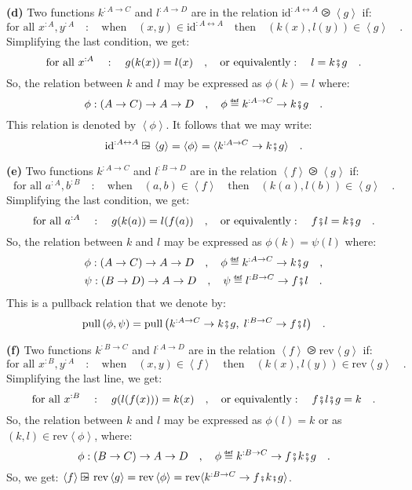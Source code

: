 \textbf{(d)} Two functions $k^{:A\rightarrow C}$ and $l^{:A\rightarrow D}$
are in the relation $\text{id}^{:A\leftrightarrow A}\ogreaterthan\left<g\right>$
if:
\[
\text{for all }x^{:A},y^{:A}\quad:\quad\text{when}\quad(x,y)\in\text{id}^{:A\leftrightarrow A}\quad\text{then}\quad(k(x),l(y))\in\left<g\right>\quad.
\]
Simplifying the last condition, we get:
\[
\text{for all }x^{:A}\quad:\quad g(k(x))=l(x)\quad,\quad\text{or equivalently}:\quad l=k\bef g\quad.
\]
So, the relation between $k$ and $l$ may be expressed as $\phi(k)=l$
where:
\[
\phi:\left(A\rightarrow C\right)\rightarrow A\rightarrow D\quad,\quad\phi\triangleq k^{:A\rightarrow C}\rightarrow k\bef g\quad.
\]
This relation is denoted by $\left<\phi\right>$. It follows that
we may write: 
\[
\text{id}^{:A\leftrightarrow A}\ogreaterthan\left<g\right>=\left<\phi\right>=\langle k^{:A\rightarrow C}\rightarrow k\bef g\rangle\quad.
\]

\textbf{(e)} Two functions $k^{:A\rightarrow C}$ and $l^{:B\rightarrow D}$
are in the relation $\left<f\right>\ogreaterthan\left<g\right>$ if:
\[
\text{for all }a^{:A},b^{:B}\quad:\quad\text{when}\quad(a,b)\in\left<f\right>\quad\text{then}\quad(k(a),l(b))\in\left<g\right>\quad.
\]
Simplifying the last condition, we get:
\[
\text{for all }a^{:A}\quad:\quad g(k(a))=l(f(a))\quad,\quad\text{or equivalently}:\quad f\bef l=k\bef g\quad.
\]
So, the relation between $k$ and $l$ may be expressed as $\phi(k)=\psi(l)$
where: 
\begin{align*}
 & \phi:\left(A\rightarrow C\right)\rightarrow A\rightarrow D\quad,\quad\phi\triangleq k^{:A\rightarrow C}\rightarrow k\bef g\quad,\\
 & \psi:\left(B\rightarrow D\right)\rightarrow A\rightarrow D\quad,\quad\psi\triangleq l^{:B\rightarrow C}\rightarrow f\bef l\quad.
\end{align*}
 This is a pullback relation that we denote by: 
\[
\text{pull}\,(\phi,\psi)=\text{pull}\,\big(k^{:A\rightarrow C}\rightarrow k\bef g,\;l^{:B\rightarrow C}\rightarrow f\bef l\big)\quad.
\]

\textbf{(f)} Two functions $k^{:B\rightarrow C}$ and $l^{:A\rightarrow D}$
are in the relation $\left<f\right>\ogreaterthan\text{rev}\left<g\right>$
if:
\[
\text{for all }x^{:B},y^{:A}\quad:\quad\text{when}\quad(x,y)\in\left<f\right>\quad\text{then}\quad(k(x),l(y))\in\text{rev}\left<g\right>\quad.
\]
Simplifying the last line, we get:
\[
\text{for all }x^{:B}\quad:\quad g(l(f(x)))=k(x)\quad,\quad\text{or equivalently}:\quad f\bef l\bef g=k\quad.
\]
So, the relation between $k$ and $l$ may be expressed as $\phi(l)=k$
or as $(k,l)\in\text{rev}\left<\phi\right>$, where: 
\[
\phi:\left(B\rightarrow C\right)\rightarrow A\rightarrow D\quad,\quad\phi\triangleq k^{:B\rightarrow C}\rightarrow f\bef k\bef g\quad.
\]
So, we get: $\left<f\right>\ogreaterthan\text{rev}\left<g\right>=\text{rev}\left<\phi\right>=\text{rev}\langle k^{:B\rightarrow C}\rightarrow f\bef k\bef g\rangle$.

